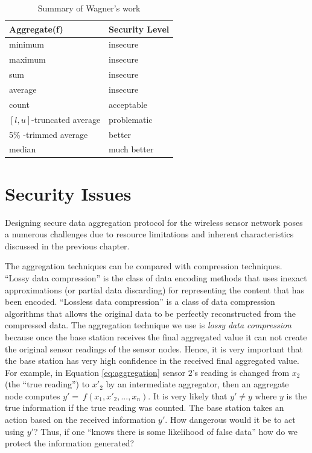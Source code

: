 	\begin{table}[!htb]	
		\begin{center}
			\begin{tabular}{ |l| l| }
				\hline
			    Aggregate(f) & Security Level \\
			    \hline
			    minimum & insecure \\
			    maximum & insecure \\
			    sum & insecure \\
				average & insecure \\
				count & acceptable \\
				$[l,u]$-truncated average & problematic \\
				5\% -trimmed average & better \\
				median & much better \\
			    \hline
			\end{tabular}
		\end{center}
		 \caption{Summary of Wagner's work}
		 \label{table:wagner}
	\end{table}

\section{Security Issues}
	\label{sec:security-issues}
	Designing secure data aggregation protocol for the wireless sensor network poses a numerous challenges due to resource limitations and inherent characteristics discussed in the previous chapter. 

	The aggregation techniques can be compared with compression techniques.
	``Lossy data compression'' is the class of data encoding methods that uses inexact approximations (or partial data discarding) for representing the content that has been encoded. 
	``Lossless data compression'' is a class of data compression algorithms that allows the original data to be perfectly reconstructed from the compressed data.
	The aggregation technique we use is \textit{lossy data compression} because once the base station receives the final aggregated value it can not create the original sensor readings of the sensor nodes.
	Hence, it is very important that the base station has very high confidence in the received final aggregated value. 
	For example, in Equation \ref{eq:aggregation} sensor $2$'s reading is changed from $x_{2}$ (the ``true reading'') to $x'_{2}$ by an intermediate aggregator, then an aggregate node computes $y' =\ f(x_{1},x'_{2},...,x_{n})$.
	It is very likely that $y' \neq y$ where $y$ is the true information if the true reading was counted.
	The base station takes an action based on the received information $y'$.
	How dangerous would it be to act using $y'$?
	Thus, if one ``knows there is some likelihood of false data'' how do we protect the information generated?
	
